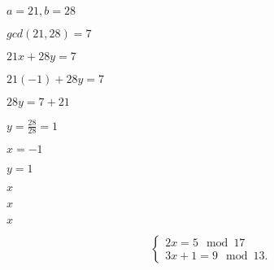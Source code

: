 \documentclass[10pt]{book}
\begin{document}
\begin{mdSnippets}
\begin{mdInlineSnippet}[07f439fc0d31555e951842b96ca58de0]%
$a=21, b=28$\end{mdInlineSnippet}%
\begin{mdInlineSnippet}[5f31b47f723a25d21f66cb782d30c8b7]%
$gcd(21,28) = 7$\end{mdInlineSnippet}%
\begin{mdInlineSnippet}[331511e4a9d53d60f704fb47943eb9a0]%
$21x + 28y = 7$\end{mdInlineSnippet}%
\begin{mdInlineSnippet}[f460d3468873e809064a1d1f35fcaeb0]%
$21(-1) + 28y = 7$\end{mdInlineSnippet}%
\begin{mdInlineSnippet}[c66ba41b02a9415062015d91b66db04c]%
$28y = 7 + 21$\end{mdInlineSnippet}%
\begin{mdInlineSnippet}%
$y = \frac{28} {28} = 1$\end{mdInlineSnippet}%
\begin{mdInlineSnippet}[7c477670495296c99a5898d116e275fc]%
$x = -1$\end{mdInlineSnippet}%
\begin{mdInlineSnippet}[5a6fb152b0e79d61bb16fd58014ba123]%
$y = 1$\end{mdInlineSnippet}%
\begin{mdInlineSnippet}[9dd4e461268c8034f5c8564e155c67a6]%
$x$\end{mdInlineSnippet}%
\begin{mdInlineSnippet}[9dd4e461268c8034f5c8564e155c67a6]%
$x$\end{mdInlineSnippet}%
\begin{mdInlineSnippet}[9dd4e461268c8034f5c8564e155c67a6]%
$x$\end{mdInlineSnippet}%
\begin{mdDisplaySnippet}%
\[%
\left\{\begin{array}{l}
2x = 5 \mod 17\\
3x + 1 = 9 \mod 13.
\end{array}\right.
\]%
\end{mdDisplaySnippet}%

\end{mdSnippets}
\end{document}
